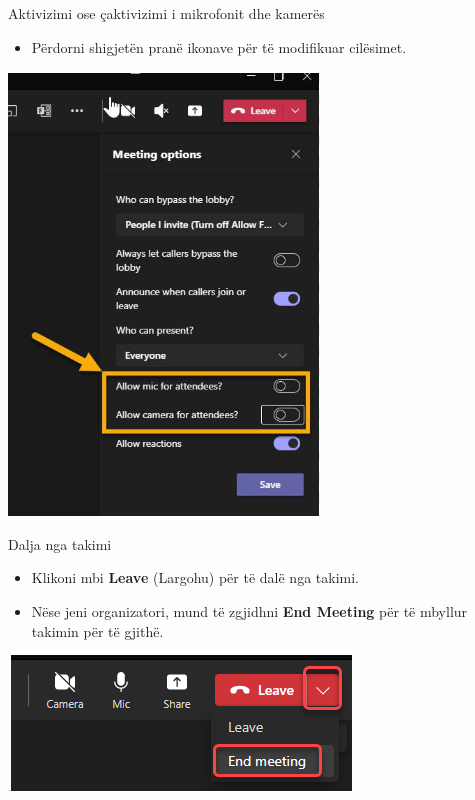 \documentclass[
  ignorenonframetext,
]{beamer}
\providecommand{\tightlist}{%
  \setlength{\itemsep}{0pt}\setlength{\parskip}{0pt}}
\begin{document}
\begin{frame}{Aktivizimi ose çaktivizimi i mikrofonit dhe kamerës}
\label{aktivizimi-ose-uxe7aktivizimi-i-mikrofonit-dhe-kameruxebs-1}
\begin{itemize}
\tightlist
\item
  Përdorni shigjetën pranë ikonave për të modifikuar cilësimet.
\end{itemize}

\includegraphics{./images/teams17.png}
\end{frame}

\begin{frame}{Dalja nga takimi}
\label{dalja-nga-takimi}
\begin{itemize}
\item
  Klikoni mbi \textbf{Leave} (Largohu) për të dalë nga takimi.
\item
  Nëse jeni organizatori, mund të zgjidhni \textbf{End Meeting} për të
  mbyllur takimin për të gjithë.
\end{itemize}

\includegraphics{./images/teams18.png}
\end{frame}
\end{document}
